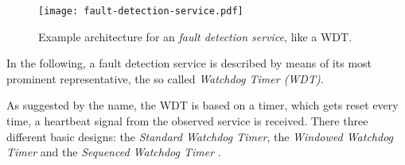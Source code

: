 \begin{figure}[!htbp]
\centering
\texttt{[image: fault-detection-service.pdf]}
\caption{Example architecture for an \emph{fault detection service}, like a WDT.}
\label{fig:fault-detection-service}
\end{figure}

In the following, a fault detection service is described by means of its most prominent representative, the so called \emph{Watchdog Timer (WDT)}.

As suggested by the name, the WDT is based on a timer, which gets reset every time, a heartbeat signal from the observed service is received. There three different basic designs: the \emph{Standard Watchdog Timer}, the \emph{Windowed Watchdog Timer} and the \emph{Sequenced Watchdog Timer} \cite{elattar2007}.


